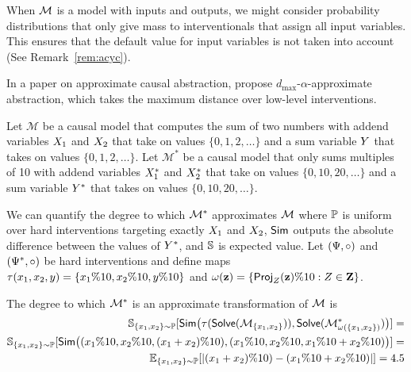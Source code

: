 \documentclass[twoside,11pt]{article}
\begin{document}
\begin{remark}
When $\mathcal{M}$ is a model with inputs and outputs, we might consider probability distributions that only give mass to interventionals that assign all input variables. This ensures that the default value for input variables is not taken into account (See Remark~\ref{rem:acyc}).
\end{remark}

\begin{remark}
In a paper on approximate causal abstraction, \cite{beckers20a} propose $d_{\text{max}}$-$\alpha$-approximate abstraction, which takes the maximum distance over low-level interventions.
\end{remark}

\begin{example}
Let $\mathcal{M}$ be a causal model that computes the sum of two numbers with addend variables $X_1$ and $X_2$ that take on values $\{0, 1, 2, \dots\}$ and a sum variable $Y$ that takes on values $\{0, 1, 2, \dots\}$. Let $\mathcal{M}^*$ be a causal model that only sums multiples of 10 with addend variables $X_1^*$ and $X_2^*$ that take on values $\{0, 10, 20, \dots\}$ and a sum variable $Y^*$ that takes on values $\{0, 10, 20, \dots\}$. 

We can quantify the degree to which $\mathcal{M}^*$ approximates $\mathcal{M}$ where $\mathbb{P}$ is uniform over hard interventions targeting exactly $X_1$ and $X_2$, $\mathsf{Sim}$ outputs the absolute difference between the values of $Y^*$, and $\mathbb{S}$ is expected value. Let $(\Psi, \circ)$ and $(\Psi^*, \circ)$ be hard interventions and define maps $\tau(x_1, x_2, y) = \{x_1 \% 10, x_2 \% 10, y \% 10\}$ and $\omega(\mathbf{z}) = \{\mathsf{Proj}_{Z}(\mathbf{z}) \% 10: Z \in \mathbf{Z}\}$. 

The degree to which $\mathcal{M}^*$ is an approximate transformation of $\mathcal{M}$ is 
\begin{align*}
\mathbb{S}_{\{x_1, x_2\}\sim \mathbb{P}}[\mathsf{Sim}\big( \tau(\mathsf{Solve}(\mathcal{M}_{\{x_1, x_2\}}) ), \mathsf{Solve}(\mathcal{M}^*_{\omega(\{x_1, x_2\})} )\big) ] =\\
\mathbb{S}_{\{x_1, x_2\}\sim \mathbb{P}}[\mathsf{Sim}\big( (x_1 \% 10, x_2 \% 10, (x_1 + x_2) \% 10), (x_1 \% 10, x_2 \% 10, x_1 \% 10 + x_2 \% 10)\big)] = \\
\mathbb{E}_{\{x_1, x_2\}\sim \mathbb{P}}[|(x_1 + x_2) \% 10) - (x_1 \% 10 + x_2 \% 10)|] =4.5
\end{align*}
    
\end{example}
\end{document}

